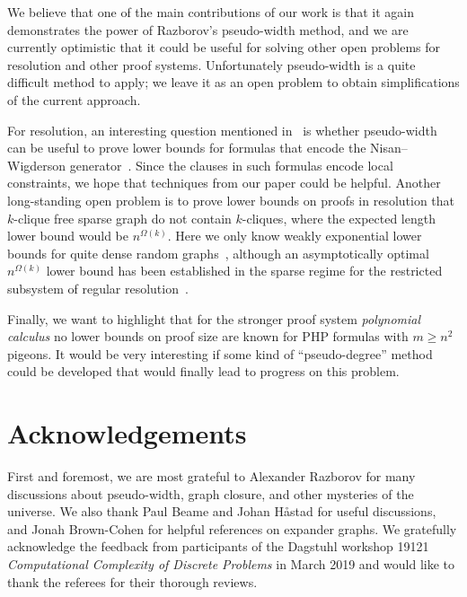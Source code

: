 \documentclass{theoretics}
\newcommand{\bigomega}[1]{\Omega ( #1 )}
\newcommand{\introduceterm}[1]{{\emph{#1}}}
\newcommand{\pseudowidth}{pseudo-width\xspace}
\numberwithin{equation}{section}
\begin{document}
We believe that one of the main contributions of our work is that it
again demonstrates the power of Razborov's \pseudowidth method, and we
are currently optimistic that it could be useful for solving other
open problems for resolution and other proof systems. Unfortunately
\pseudowidth is a quite difficult method to apply; we leave it as an
open problem to obtain simplifications of the current approach.



For resolution, an interesting question mentioned
in~\cite{Razborov04ResolutionLowerBoundsPM} is whether \pseudowidth
can be useful to prove lower bounds for formulas that encode the
Nisan--Wigderson generator~\cite{ABRW04Pseudorandom,Razborov15PseudorandomGeneratorsHard}.
Since the clauses in such formulas encode local constraints, we hope
that techniques from our paper could 
be helpful.
Another long-standing open problem is to prove lower bounds on proofs
in resolution that
\mbox{$k$-clique} free sparse graph
do not contain
\mbox{$k$-cliques}, where the expected length lower bound would be
$n^{\bigomega{k}}$.
Here we only know weakly exponential lower bounds for quite dense
random  graphs~\cite{BIS07IndependentSets,Pang21},
although an asymptotically optimal
$n^{\bigomega{k}}$ lower bound 
has been
established in the sparse
regime for the restricted subsystem of regular 
resolution~\cite{ABdRLNR18Clique}.

Finally, we want to highlight that for the stronger proof system
\introduceterm{polynomial calculus}
\cite{ABRW02SpaceComplexity,CEI96Groebner}
no lower bounds on proof size are known for PHP formulas with
$m \geq n^2$ pigeons. It would be very interesting if some kind of
``pseudo-degree'' method could be developed that would finally lead to
progress on this problem.


 
\section*{Acknowledgements}

First and foremost, we are most grateful to Alexander Razborov for
many discussions about \pseudowidth, graph closure, and other
mysteries of the universe. We also thank Paul Beame and Johan Håstad
for useful discussions, and Jonah Brown-Cohen for helpful references
on expander graphs. We gratefully acknowledge the feedback from
participants of the Dagstuhl workshop 19121 \emph{Computational
  Complexity of Discrete Problems} in March 2019 and would like to
thank the referees for their thorough reviews.


\printbibliography
\end{document}
